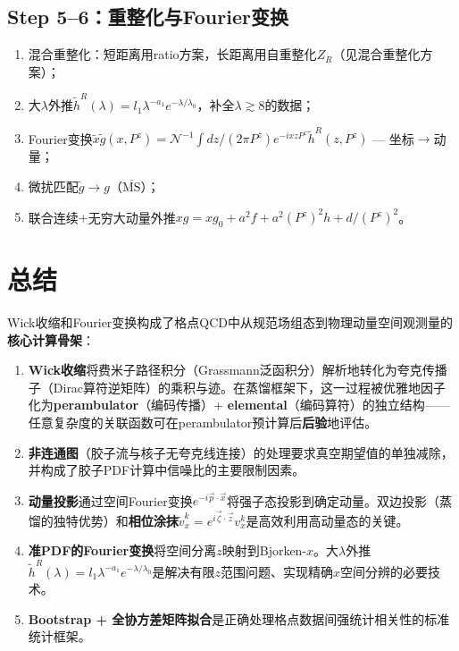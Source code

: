 \documentclass[12pt,a4paper]{ctexart}
\theoremstyle{definition}
\begin{document}
\subsection{Step 5--6：重整化与Fourier变换}

\begin{enumerate}
    \item 混合重整化：短距离用ratio方案，长距离用自重整化$Z_R$（见混合重整化方案）；
    \item 大$\lambda$外推$\tilde{h}^R(\lambda) = l_1 \lambda^{-a_1} e^{-\lambda/\lambda_0}$，补全$\lambda \gtrsim 8$的数据；
    \item Fourier变换$\tilde{x}\tilde{g}(x,P^z) = \mathcal{N}^{-1} \int dz/(2\pi P^z) e^{-ixzP^z} \tilde{h}^R(z, P^z)$ — 坐标$\to$动量；
    \item 微扰匹配$\tilde{g} \to g$（$\overline{\text{MS}}$）；
    \item 联合连续$+$无穷大动量外推$xg = xg_0 + a^2f + a^2(P^z)^2h + d/(P^z)^2$。
\end{enumerate}

\section{总结}

Wick收缩和Fourier变换构成了格点QCD中从规范场组态到物理动量空间观测量的\textbf{核心计算骨架}：

\begin{enumerate}
    \item \textbf{Wick收缩}将费米子路径积分（Grassmann泛函积分）解析地转化为夸克传播子（Dirac算符逆矩阵）的乘积与迹。在蒸馏框架下，这一过程被优雅地因子化为\textbf{perambulator}（编码传播）+ \textbf{elemental}（编码算符）的独立结构——任意复杂度的关联函数可在perambulator预计算后\textbf{后验}地评估\cite{Peardon2009}。

    \item \textbf{非连通图}（胶子流与核子无夸克线连接）的处理要求真空期望值的单独减除，并构成了胶子PDF计算中信噪比的主要限制因素\cite{Chen2025gluon,NoteGluonPDFs}。

    \item \textbf{动量投影}通过空间Fourier变换$e^{-i\vec{p}\cdot\vec{x}}$将强子态投影到确定动量。双边投影（蒸馏的独特优势）和\textbf{相位涂抹}$\tilde{v}^k_x = e^{i\vec{\zeta}\cdot\vec{z}}v^k_x$是高效利用高动量态的关键\cite{Egerer2021a}。

    \item \textbf{准PDF的Fourier变换}将空间分离$z$映射到Bjorken-$x$。大$\lambda$外推$\tilde{h}^R(\lambda) = l_1 \lambda^{-a_1} e^{-\lambda/\lambda_0}$是解决有限$z$范围问题、实现精确$x$空间分辨的必要技术\cite{Chen2025gluon}。

    \item \textbf{Bootstrap + 全协方差矩阵拟合}是正确处理格点数据间强统计相关性的标准统计框架\cite{Chen2025gluon,UKQCD1993}。
\end{enumerate}
\end{document}
